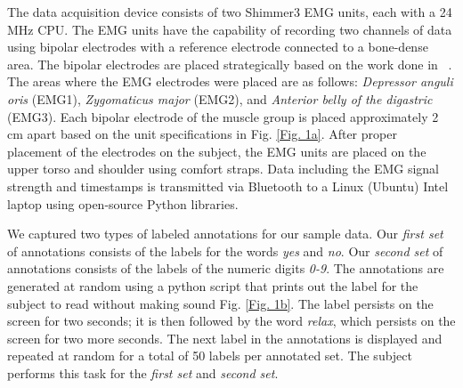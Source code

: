 \documentclass{article}
\begin{document}
The data acquisition device consists of two Shimmer3 EMG units, each with a 24 MHz CPU. The EMG units have the capability of recording two channels of data using  bipolar electrodes with a reference electrode connected to a bone-dense area. The bipolar electrodes are placed strategically based on the work done in ~\cite{lopez-larraz_syllable-based_2010}. The areas where the EMG electrodes were placed are as follows: \textit{Depressor anguli oris} (EMG1), \textit{Zygomaticus major} (EMG2), and \textit{Anterior belly of the digastric} (EMG3). Each bipolar electrode of the muscle group is placed approximately 2 cm apart based on the unit specifications in Fig. \ref{Fig. 1a}. After proper placement of the electrodes on the subject, the EMG units are placed on the upper torso and shoulder using comfort straps.  Data including the EMG signal strength and timestamps is transmitted via Bluetooth to a Linux (Ubuntu) Intel laptop using  open-source Python libraries.

We captured two types of labeled annotations for our sample data. Our \textit{first set} of annotations consists of the labels for the words \textit{yes} and \textit{no}. Our \textit{second set} of annotations consists of the labels of the numeric digits \textit{0-9}. The annotations are generated at random using a python script that prints out the label for the subject to read without making sound Fig. \ref{Fig. 1b}. The label persists on the screen for two seconds; it is then followed by the word \textit{relax}, which persists on the screen for two more seconds. The next label in the annotations is displayed and repeated at random for a total of 50 labels per annotated set. The subject performs this task for the \textit{first set} and \textit{second set}. %
\end{document}
